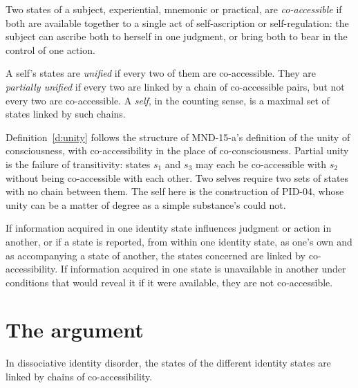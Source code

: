\documentclass{situationist-preprint}
\begin{document}
\begin{definition}[Co-accessibility]\label{d:co}
Two states of a subject, experiential, mnemonic or practical, are \emph{co-accessible} if both are available together to a single act of self-ascription or self-regulation: the subject can ascribe both to herself in one judgment, or bring both to bear in the control of one action.
\end{definition}

\begin{definition}\label{d:unity}
A self's states are \emph{unified} if every two of them are co-accessible. They are \emph{partially unified} if every two are linked by a chain of co-accessible pairs, but not every two are co-accessible. A \emph{self}, in the counting sense, is a maximal set of states linked by such chains.
\end{definition}

Definition~\ref{d:unity} follows the structure of MND-15-a's definition of the unity of consciousness, with co-accessibility in the place of co-consciousness. Partial unity is the failure of transitivity: states $s_1$ and $s_3$ may each be co-accessible with $s_2$ without being co-accessible with each other. Two selves require two sets of states with no chain between them. The self here is the construction of PID-04, whose unity can be a matter of degree as a simple substance's could not.

\begin{principle}\label{p:ev}
If information acquired in one identity state influences judgment or action in another, or if a state is reported, from within one identity state, as one's own and as accompanying a state of another, the states concerned are linked by co-accessibility. If information acquired in one state is unavailable in another under conditions that would reveal it if it were available, they are not co-accessible.
\end{principle}

\section{The argument}

\begin{lemma}\label{l:linked}
In dissociative identity disorder, the states of the different identity states are linked by chains of co-accessibility.
\end{lemma}
\end{document}
